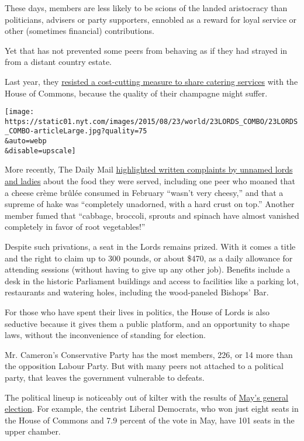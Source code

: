 These days, members are less likely to be scions of the landed
aristocracy than politicians, advisers or party supporters, ennobled as
a reward for loyal service or other (sometimes financial) contributions.

Yet that has not prevented some peers from behaving as if they had
strayed in from a distant country estate.

Last year, they
\href{http://www.nytimes.com/2014/12/17/world/europe/save-a-few-pennies-on-champagne-lawmakers-in-britains-house-of-lords-are-aghast.html}{resisted
a cost-cutting measure to share catering services} with the House of
Commons, because the quality of their champagne might suffer.

\texttt{[image: https://static01.nyt.com/images/2015/08/23/world/23LORDS\_COMBO/23LORDS\_COMBO-articleLarge.jpg?quality=75\\\&auto=webp\\\&disable=upscale]}

More recently, The Daily Mail
\href{http://www.dailymail.co.uk/news/article-3134445/Whingeing-peers-lodge-string-complaints-exclusive-taxpayer-funded-restaurants-House-Lords.html\#ixzz3jCkDl9My}{highlighted
written complaints by unnamed lords and ladies} about the food they were
served, including one peer who moaned that a cheese crème brûlée
consumed in February ``wasn't very cheesy,'' and that a supreme of hake
was ``completely unadorned, with a hard crust on top.'' Another member
fumed that ``cabbage, broccoli, sprouts and spinach have almost vanished
completely in favor of root vegetables!''

Despite such privations, a seat in the Lords remains prized. With it
comes a title and the right to claim up to 300 pounds, or about \$470,
as a daily allowance for attending sessions (without having to give up
any other job). Benefits include a desk in the historic Parliament
buildings and access to facilities like a parking lot, restaurants and
watering holes, including the wood-paneled Bishops' Bar.

For those who have spent their lives in politics, the House of Lords is
also seductive because it gives them a public platform, and an
opportunity to shape laws, without the inconvenience of standing for
election.

Mr. Cameron's Conservative Party has the most members, 226, or 14 more
than the opposition Labour Party. But with many peers not attached to a
political party, that leaves the government vulnerable to defeats.

The political lineup is noticeably out of kilter with the results of
\href{http://www.nytimes.com/2015/05/09/world/europe/david-cameron-and-conservatives-emerge-victorious-in-british-election.html}{May's
general election}. For example, the centrist Liberal Democrats, who won
just eight seats in the House of Commons and 7.9 percent of the vote in
May, have 101 seats in the upper chamber.

